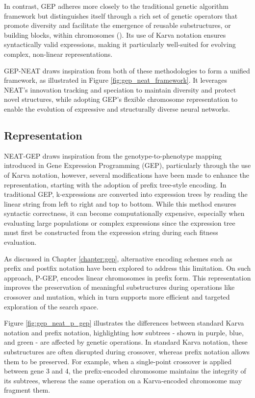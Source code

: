 \parbreak\noindent In contrast, GEP adheres more closely to the traditional genetic algorithm framework but distinguishes itself through a rich set of genetic operators that promote diversity and facilitate the emergence of reusable substructures, or building blocks, within chromosomes (\cite{ferreira2006gene}). Its use of Karva notation ensures syntactically valid expressions, making it particularly well-suited for evolving complex, non-linear representations.

\parbreak\noindent GEP-NEAT draws inspiration from both of these methodologies to form a unified framework, as illustrated in Figure \ref{fig:gep_neat_framework}. It leverages NEAT's innovation tracking and speciation to maintain diversity and protect novel structures, while adopting GEP's flexible chromosome representation to enable the evolution of expressive and structurally diverse neural networks.

\subsection{Representation}\label{sec:gep_neat_representation}
NEAT-GEP draws inspiration from the genotype-to-phenotype mapping introduced in Gene Expression Programming (GEP), particularly through the use of Karva notation, however, several modifications have been made to enhance the representation, starting with the adoption of prefix tree-style encoding. In traditional GEP, k-expressions are converted into expression trees by reading the linear string from left to right and top to bottom. While this method ensures syntactic correctness, it can become computationally expensive, especially when evaluating large populations or complex expressions since the expression tree must first be constructed from the expression string during each fitness evaluation. 

\parbreak\noindent As discussed in Chapter \ref{chapter:gep}, alternative encoding schemes such as prefix and postfix notation have been explored to address this limitation. On such approach, P-GEP, encodes linear chromosomes in prefix form. This representation improves the preservation of meaningful substructures during operations like crossover and mutation, which in turn supports more efficient and targeted exploration of the search space.

\parbreak\noindent Figure \ref{fig:gep_neat_p_gep} illustrates the differences between standard Karva notation and prefix notation, highlighting how subtrees - shown in purple, blue, and green - are affected by genetic operations. In standard Karva notation, these substructures are often disrupted during crossover, whereas prefix notation allows them to be preserved. For example, when a single-point crossover is applied between gene 3 and 4, the prefix-encoded chromosome maintains the integrity of its subtrees, whereas the same operation on a Karva-encoded chromosome may fragment them.

